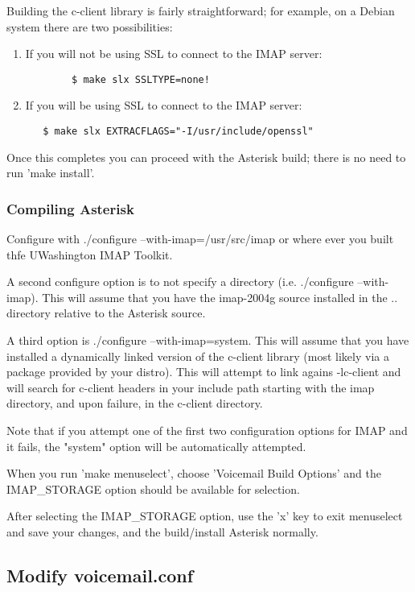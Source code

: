 Building the c-client library is fairly straightforward; for example, on a
Debian system there are two possibilities:

\begin{enumerate}
    \item If you will not be using SSL to connect to the IMAP server:
   \begin{verbatim}
        $ make slx SSLTYPE=none!
   \end{verbatim}
    \item If you will be using SSL to connect to the IMAP server:
   \begin{verbatim}
   $ make slx EXTRACFLAGS="-I/usr/include/openssl"
   \end{verbatim}
\end{enumerate}

Once this completes you can proceed with the Asterisk build; there is no
need to run 'make install'.

\subsubsection{Compiling Asterisk}

Configure with ./configure --with-imap=/usr/src/imap
or where ever you built thfe UWashington IMAP Toolkit. 

A second configure option is to not specify a directory (i.e.
./configure --with-imap). This will assume that you have the
imap-2004g source installed in the .. directory relative to the
Asterisk source.

A third option is ./configure --with-imap=system. This will assume
that you have installed a dynamically linked version of the c-client
library (most likely via a package provided by your distro). This will
attempt to link agains -lc-client and will search for c-client headers
in your include path starting with the imap directory, and upon failure,
in the c-client directory.

Note that if you attempt one of the first two configuration options for
IMAP and it fails, the "system" option will be automatically attempted.

When you run 'make menuselect', choose 'Voicemail Build Options' and the
IMAP\_STORAGE option should be available for selection.

After selecting the IMAP\_STORAGE option, use the 'x' key to exit
menuselect and save your changes, and the build/install Asterisk
normally.

\subsection{Modify voicemail.conf}

